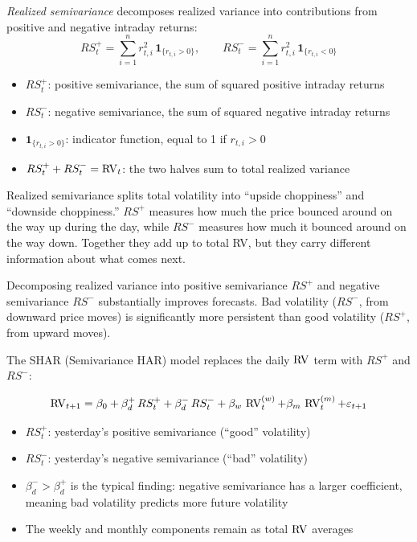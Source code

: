 \begin{prereq}
\emph{Realized semivariance} decomposes realized variance into contributions from positive and negative intraday returns:
\begin{equation}
  RS^+_t = \sum_{i=1}^{n} r^2_{t,i} \, \mathbf{1}_{\{r_{t,i} > 0\}}, \qquad
  RS^-_t = \sum_{i=1}^{n} r^2_{t,i} \, \mathbf{1}_{\{r_{t,i} < 0\}}
  \label{eq:semivariance}
\end{equation}
\begin{itemize}[nosep]
  \item $RS^+_t$: positive semivariance, the sum of squared positive intraday returns
  \item $RS^-_t$: negative semivariance, the sum of squared negative intraday returns
  \item $\mathbf{1}_{\{r_{t,i} > 0\}}$: indicator function, equal to 1 if $r_{t,i} > 0$
  \item $RS^+_t + RS^-_t = \operatorname{RV}_t$: the two halves sum to total realized variance
\end{itemize}
\end{prereq}

\begin{intuition}
Realized semivariance splits total volatility into ``upside choppiness'' and ``downside choppiness.''
$RS^+$ measures how much the price bounced around on the way up during the day, while $RS^-$ measures how much it bounced around on the way down.
Together they add up to total RV, but they carry different information about what comes next.
\end{intuition}

\begin{keyresult}
Decomposing realized variance into positive semivariance $RS^+$ and negative semivariance $RS^-$ substantially improves forecasts.
Bad volatility ($RS^-$, from downward price moves) is significantly more persistent than good volatility ($RS^+$, from upward moves).
\end{keyresult}

The SHAR (Semivariance HAR) model replaces the daily $\operatorname{RV}$ term with $RS^+$ and $RS^-$:

\begin{equation}
  \operatorname{RV}_{t+1} = \beta_0 + \beta^+_d \, RS^+_t + \beta^-_d \, RS^-_t
             + \beta_w \, \operatorname{RV}^{(w)}_t + \beta_m \, \operatorname{RV}^{(m)}_t + \varepsilon_{t+1}
  \label{eq:shar}
\end{equation}
\begin{itemize}[nosep]
  \item $RS^+_t$: yesterday's positive semivariance (``good'' volatility)
  \item $RS^-_t$: yesterday's negative semivariance (``bad'' volatility)
  \item $\beta^-_d > \beta^+_d$ is the typical finding: negative semivariance has a larger coefficient, meaning bad volatility predicts more future volatility
  \item The weekly and monthly components remain as total $\operatorname{RV}$ averages
\end{itemize}

